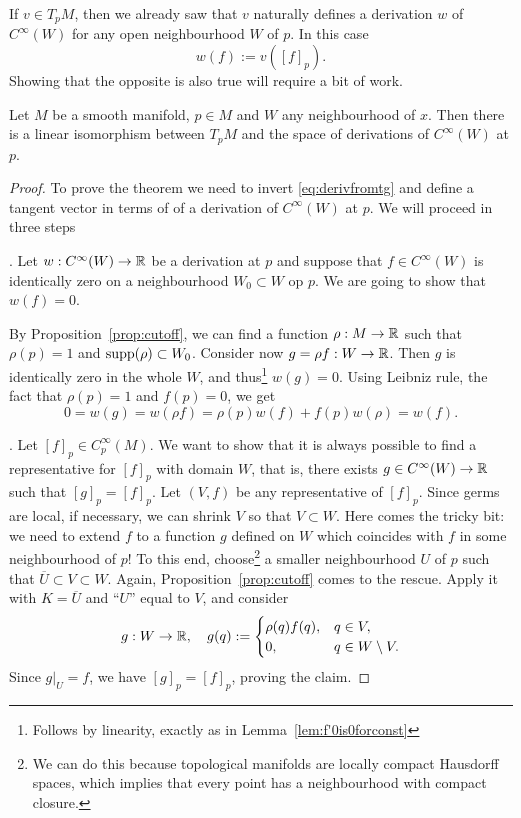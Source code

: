 If $v\in T_p M$, then we already saw that $v$ naturally defines a derivation $w$ of $C^\infty(W)$ for any open neighbourhood $W$ of $p$.
In this case
\begin{equation}\label{eq:derivfromtg}
  w(f) := v([f]_p).
\end{equation}
Showing that the opposite is also true will require a bit of work.

\begin{proposition}
  Let $M$ be a smooth manifold, $p\in M$ and $W$ any neighbourhood of $x$.
  Then there is a linear isomorphism between $T_p M$ and the space of derivations of $C^\infty(W)$ at $p$.
\end{proposition}
\begin{proof}
  To prove the theorem we need to invert \eqref{eq:derivfromtg} and define a tangent vector in terms of of a derivation of $C^\infty(W)$ at $p$.
  We will proceed in three steps

  . Let $w:C^\infty(W) \to\mathbb{R}$ be a derivation at $p$ and suppose that $f\in C^\infty(W)$ is identically zero on a neighbourhood $W_0\subset W$ op $p$. We are going to show that $w(f)=0$.

  By Proposition~\ref{prop:cutoff}, we can find a function $\rho:M\to\mathbb{R}$ such that $\rho(p)=1$ and $\operatorname{supp}(\rho) \subset W_0$. Consider now $g = \rho f : W \to \mathbb{R}$. Then $g$ is identically zero in the whole $W$, and thus\footnote{Follows by linearity, exactly as in Lemma~\ref{lem:f'0is0forconst}} $w(g) = 0$. Using Leibniz rule, the fact that $\rho(p)=1$ and $f(p) = 0$, we get
  \begin{equation}
    0 = w(g) = w(\rho f) = \rho(p) w(f) + f(p)w(\rho) = w(f).
  \end{equation}

  .
  Let $[f]_p\in C_p^\infty(M)$.
  We want to show that it is always possible to find a representative for $[f]_p$ with domain $W$, that is, there exists $g\in C^\infty(W)\to\mathbb{R}$ such that $[g]_p = [f]_p$.
  Let $(V, f)$ be any representative of $[f]_p$.
  Since germs are local, if necessary, we can shrink $V$ so that $V\subset W$.
  Here comes the tricky bit: we need to extend $f$ to a function $g$ defined on $W$ which coincides with $f$ in some neighbourhood of $p$!
  To this end, choose\footnote{We can do this because topological manifolds are locally compact Hausdorff spaces, which implies that every point has a neighbourhood with compact closure.} a smaller neighbourhood $U$ of $p$ such that $\overline{U}\subset V\subset W$.
  Again, Proposition~\ref{prop:cutoff} comes to the rescue. Apply it with $K=\overline{U}$ and ``$U$'' equal to $V$, and consider
  \begin{equation}
    g:W\to\mathbb{R}, \quad
    g(q) := \begin{cases}
      \rho(q)f(q), & q\in V,\\
      0, & q \in W\setminus V.
    \end{cases}
  \end{equation}
  Since $g|_U = f$, we have $[g]_p = [f]_p$, proving the claim.


\end{proof}

